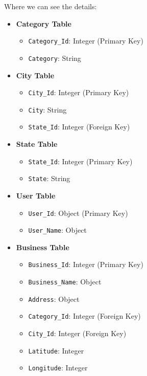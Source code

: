 \documentclass[12pt]{article}
\begin{document}
Where we can see the details:
\begin{itemize}

    \item \textbf{Category Table}
    \begin{itemize}
        \item \texttt{Category\_Id}: Integer (Primary Key)
        \item \texttt{Category}: String
    \end{itemize}

    \item \textbf{City Table}
    \begin{itemize}
        \item \texttt{City\_Id}: Integer (Primary Key)
        \item \texttt{City}: String
        \item \texttt{State\_Id}: Integer (Foreign Key)
    \end{itemize}

    \item \textbf{State Table}
    \begin{itemize}
        \item \texttt{State\_Id}: Integer (Primary Key)
        \item \texttt{State}: String
    \end{itemize}

    \item \textbf{User Table}
    \begin{itemize}
        \item \texttt{User\_Id}: Object (Primary Key)
        \item \texttt{User\_Name}: Object
    \end{itemize}

    \item \textbf{Business Table}
    \begin{itemize}
        \item \texttt{Business\_Id}: Integer (Primary Key)
        \item \texttt{Business\_Name}: Object
        \item \texttt{Address}: Object
        \item \texttt{Category\_Id}: Integer (Foreign Key)
        \item \texttt{City\_Id}: Integer (Foreign Key)
        \item \texttt{Latitude}: Integer
        \item \texttt{Longitude}: Integer
    \end{itemize}


\end{itemize}
\end{document}
